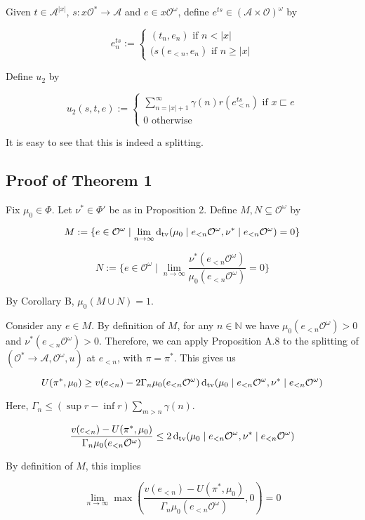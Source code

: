 \documentclass[a4paper]{article}
\newcommand{\Dtv}{\operatorname{d}_{\textnormal{tv}}}
\newcommand{\Nats}{\mathbb{N}}
\newcommand{\Abs}[1]{\lvert #1 \rvert}
\newcommand{\Act}{\mathcal{A}}
\newcommand{\Obs}{\mathcal{O}}
\newcommand{\ObsO}{\Obs^\omega}
\newcommand{\Pol}{\Obs^* \rightarrow \Act}
\begin{document}
Given ${t \in \Act^{\Abs{x}}}$, ${s: x\Obs^* \rightarrow \Act}$ and ${e \in x\ObsO}$, define ${e^{ts} \in (\Act \times \Obs)^\omega}$ by

$$e^{ts}_n:=\begin{cases}(t_n,e_n) \text{ if } n < \Abs{x}\\(s(e_{<n},e_n) \text{ if } n \geq \Abs{x}\end{cases}$$

Define ${u_2}$ by

$$u_2(s,t,e):=\begin{cases}\sum_{n = \Abs{x}+1}^{\infty} \gamma(n) r(e^{ts}_{<n}) \text{ if } x \sqsubset e\\0 \text{ otherwise}\end{cases}$$

It is easy to see that this is indeed a splitting.

\subsection{Proof of Theorem 1}

Fix ${\mu_0 \in \Phi}$. Let ${\nu^* \in \Phi'}$ be as in Proposition 2. Define ${M,N \subseteq \ObsO}$ by

$$M:=\{e \in \ObsO \mid \lim_{n \rightarrow \infty} \Dtv(\mu_0 \mid e_{<n}\ObsO, \nu^* \mid e_{<n}\ObsO) = 0\}$$

$$N:=\{e \in \ObsO \mid \lim_{n \rightarrow \infty} \frac{\nu^*(e_{<n}\ObsO)}{\mu_0(e_{<n}\ObsO)} = 0\}$$

By Corollary B, ${\mu_0(M \cup N) = 1}$.

Consider any ${e \in M}$. By definition of ${M}$, for any ${n \in \Nats}$ we have ${\mu_0(e_{<n}\ObsO) > 0}$ and ${\nu^*(e_{<n}\ObsO) > 0}$. Therefore, we can apply Proposition A.8 to the splitting of ${(\Pol,\ObsO,u)}$ at ${e_{<n}}$, with ${\pi = \pi^*}$. This gives us

$$U(\pi^*,\mu_0) \geq v(e_{<n})-2\Gamma_n \mu_0(e_{<n}\ObsO)\Dtv(\mu_0 \mid e_{<n}\ObsO, \nu^* \mid e_{<n}\ObsO)$$

Here, ${\Gamma_n \leq (\sup r - \inf r) \sum_{m > n} \gamma(n)}$. 

$$\frac{v(e_{<n}) - U(\pi^*,\mu_0)}{\Gamma_n \mu_0(e_{<n}\ObsO)} \leq 2\Dtv(\mu_0 \mid e_{<n}\ObsO, \nu^* \mid e_{<n}\ObsO)$$

By definition of ${M}$, this implies

$$\lim_{n \rightarrow \infty} \max(\frac{v(e_{<n}) - U(\pi^*,\mu_0)}{\Gamma_n \mu_0(e_{<n}\ObsO)},0) = 0 $$
\end{document}
